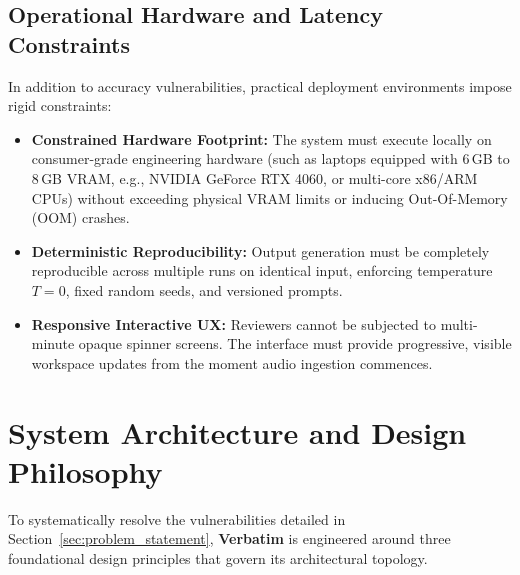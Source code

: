 \documentclass[10pt,a4paper]{article}
\begin{document}
\subsection{Operational Hardware and Latency Constraints}
In addition to accuracy vulnerabilities, practical deployment environments impose rigid constraints:
\begin{itemize}
    \item \textbf{Constrained Hardware Footprint:} The system must execute locally on consumer-grade engineering hardware (such as laptops equipped with 6\,GB to 8\,GB VRAM, e.g., NVIDIA GeForce RTX 4060, or multi-core x86/ARM CPUs) without exceeding physical VRAM limits or inducing Out-Of-Memory (OOM) crashes.
    \item \textbf{Deterministic Reproducibility:} Output generation must be completely reproducible across multiple runs on identical input, enforcing temperature $T = 0$, fixed random seeds, and versioned prompts.
    \item \textbf{Responsive Interactive UX:} Reviewers cannot be subjected to multi-minute opaque spinner screens. The interface must provide progressive, visible workspace updates from the moment audio ingestion commences.
\end{itemize}

\section{System Architecture and Design Philosophy}
\label{sec:system_architecture}

To systematically resolve the vulnerabilities detailed in Section~\ref{sec:problem_statement}, \textbf{Verbatim} is engineered around three foundational design principles that govern its architectural topology.
\end{document}
